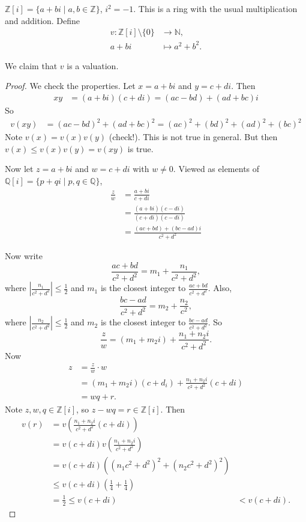 \begin{example}
	$\mathbb Z[i]=\{a+bi\mid a,b\in\mathbb Z\}$, $i^2=-1$. This is a ring with the usual multiplication and addition. Define
	\begin{align*}
		v\colon \mathbb Z[i]\setminus\{0\}&\to\mathbb N,\\
		a+bi&\mapsto a^2+b^2.
	\end{align*}

	We claim that $v$ is a valuation.
	\begin{proof}
		We check the properties. Let $x=a+bi$ and $y=c+di$. Then
		\begin{align*}
			xy&=(a+bi)(c+di)=(ac-bd)+(ad+bc)i
		\end{align*}
		So
		\begin{align*}
			v(xy)&=(ac-bd)^2+(ad+bc)^2=(ac)^2+(bd)^2+(ad)^2+(bc)^2
		\end{align*}
		Note $v(x)=v(x)v(y)$ (check!). This is not true in general. But then $v(x)\leq v(x)v(y)=v(xy)$ is true.

		Now let $z=a+bi$ and $w=c+di$ with $w\neq 0$. Viewed as elements of $\mathbb Q[i]=\{p+qi\mid p,q\in\mathbb Q\}$,
		\begin{align*}
			\frac{z}{w}&=\frac{a+bi}{c+di}\\
			&=\frac{(a+bi)(c-di)}{(c+di)(c-di)}\\
			&=\frac{(ac+bd)+(bc-ad)i}{c^2+d^2}
		\end{align*}

		Now write
		$$\frac{ac+bd}{c^2+d^2}=m_1+\frac{n_1}{c^2+d^2},$$
		where $\left|\frac{n_1}{c^2+d^2}\right|\leq\frac 12$ and $m_1$ is the closest integer to $\frac{ac+bd}{c^2+d^2}$. Also,
		$$\frac{bc-ad}{c^2+d^2}=m_2+\frac{n_2}{c^2},$$
		where $\left|\frac{n_2}{c^2+d^2}\right|\leq\frac 12$ and $m_2$ is the closest integer to $\frac{bc-ad}{c^2+d^2}$. So
		$$\frac{z}{w}=(m_1+m_2i)+\frac{n_1+n_2i}{c^2+d^2}.$$
		Now
		\begin{align*}
			z&=\frac{z}{w}\cdot w\\
			&=(m_1+m_2i)(c+d_i)+\frac{n_1+n_2i}{c^2+d^2}(c+di)\\
			&=wq+r.
		\end{align*}
		Note $z,w,q\in\mathbb Z[i]$, so $z-wq=r\in\mathbb Z[i]$. Then
		\begin{align*}
			v(r)&=v\left(\frac{n_1+n_2i}{c^2+d^2}(c+di)\right)\\
			&=v(c+di)v\left(\frac{n_1+n_2i}{c^2+d^2}\right)\\
			&=v(c+di)\left(\left({n_1}{c^2+d^2}\right)^2+\left({n_2}{c^2+d^2}\right)^2\right)\\
			&\leq v(c+di)(\frac 14+\frac 14)\\
			&=\frac12\leq v(c+di)
			&<v(c+di).
		\end{align*}
	\end{proof}
\end{example}

